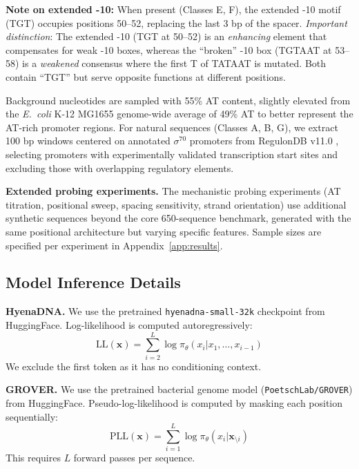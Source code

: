 \documentclass{article}
\newcommand{\LL}{\text{LL}}
\begin{document}
\textbf{Note on extended -10:} When present (Classes E, F), the extended -10 motif (TGT) occupies positions 50--52, replacing the last 3 bp of the spacer. \textit{Important distinction}: The extended -10 (TGT at 50--52) is an \textit{enhancing} element that compensates for weak -10 boxes, whereas the ``broken'' -10 box (TGTAAT at 53--58) is a \textit{weakened} consensus where the first T of TATAAT is mutated. Both contain ``TGT'' but serve opposite functions at different positions.

Background nucleotides are sampled with 55\% AT content, slightly elevated from the \textit{E.\ coli} K-12 MG1655 genome-wide average of 49\% AT \citep{blattner1997complete} to better represent the AT-rich promoter regions. For natural sequences (Classes A, B, G), we extract 100 bp windows centered on annotated $\sigma^{70}$ promoters from RegulonDB v11.0 \citep{tierrafria2022regulondb}, selecting promoters with experimentally validated transcription start sites and excluding those with overlapping regulatory elements.

\textbf{Extended probing experiments.} The mechanistic probing experiments (AT titration, positional sweep, spacing sensitivity, strand orientation) use additional synthetic sequences beyond the core 650-sequence benchmark, generated with the same positional architecture but varying specific features. Sample sizes are specified per experiment in Appendix~\ref{app:results}.

\subsection{Model Inference Details}

\textbf{HyenaDNA.} We use the pretrained \texttt{hyenadna-small-32k} checkpoint from HuggingFace. Log-likelihood is computed autoregressively:
\begin{equation}
\LL(\mathbf{x}) = \sum_{i=2}^{L} \log \pi_\theta(x_i | x_1, \ldots, x_{i-1})
\end{equation}
We exclude the first token as it has no conditioning context.

\textbf{GROVER.} We use the pretrained bacterial genome model (\texttt{PoetschLab/GROVER}) from HuggingFace. Pseudo-log-likelihood is computed by masking each position sequentially:
\begin{equation}
\text{PLL}(\mathbf{x}) = \sum_{i=1}^{L} \log \pi_\theta(x_i | \mathbf{x}_{\setminus i})
\end{equation}
This requires $L$ forward passes per sequence.
\end{document}
